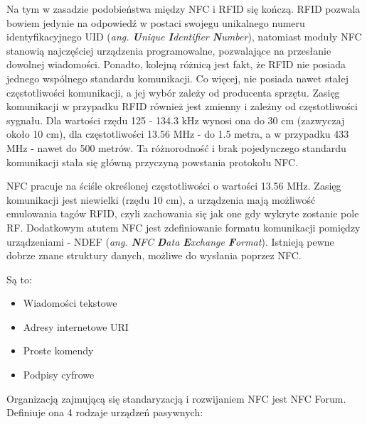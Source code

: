 Na tym w zasadzie podobieństwa między NFC i RFID się kończą. RFID pozwala bowiem jedynie na odpowiedź w postaci swojegu unikalnego numeru identyfikacyjnego UID (\textit{ang. \textbf{U}nique \textbf{I}dentifier \textbf{N}umber}), natomiast moduły NFC stanowią najczęściej urządzenia programowalne, pozwalające na przesłanie dowolnej wiadomości. Ponadto, kolejną różnicą jest fakt, że RFID nie posiada jednego wspólnego standardu komunikacji. Co więcej, nie posiada nawet stałej częstotliwości komunikacji, a jej wybór zależy od producenta sprzętu. Zasięg komunikacji w przypadku RFID również jest zmienny i zależny od częstotliwości sygnału. Dla wartości rzędu 125 - 134.3 kHz wynosi ona do 30 cm (zazwyczaj około 10 cm), dla częstotliwości 13.56 MHz - do 1.5 metra, a w przypadku 433 MHz - nawet do 500 metrów. Ta różnorodność i brak pojedynczego standardu komunikacji stała się główną przyczyną powstania protokołu NFC.

NFC pracuje na ściśle określonej częstotliwości o wartości 13.56 MHz. Zasięg komunikacji jest niewielki (rzędu 10 cm), a urządzenia mają możliwość emulowania tagów RFID, czyli zachowania się jak one gdy wykryte zostanie pole RF. Dodatkowym atutem NFC jest zdefiniowanie formatu komunikacji pomiędzy urządzeniami - NDEF (\textit{ang. \textbf{N}FC \textbf{D}ata \textbf{E}xchange \textbf{F}ormat}). Istnieją pewne dobrze znane struktury danych, możliwe do wysłania poprzez NFC.

 Są to:

\begin{itemize}
\item Wiadomości tekstowe
\item Adresy internetowe URI
\item Proste komendy
\item Podpisy cyfrowe
\end{itemize}

Organizacją zajmującą się standaryzacją i rozwijaniem NFC jest NFC Forum. Definiuje ona 4 rodzaje urządzeń pasywnych:

